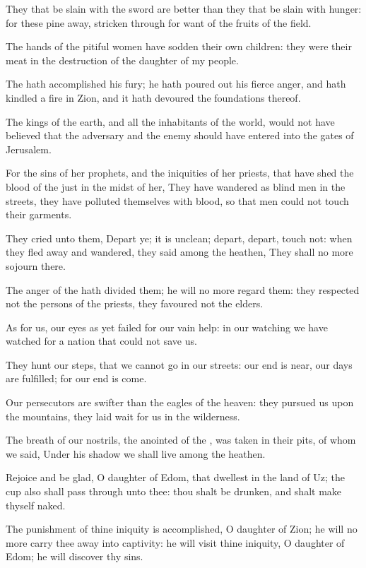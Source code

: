 \Verse They that be slain with the sword are better than they that be slain with hunger: for these pine away, stricken through for want of the fruits of the field.

\Verse The hands of the pitiful women have sodden their own children: they were their meat in the destruction of the daughter of my people.

\Verse The \LORD hath accomplished his fury; he hath poured out his fierce anger, and hath kindled a fire in Zion, and it hath devoured the foundations thereof.

\Verse The kings of the earth, and all the inhabitants of the world, would not have believed that the adversary and the enemy should have entered into the gates of Jerusalem.

\Verse For the sins of her prophets, and the iniquities of her priests, that have shed the blood of the just in the midst of her, \Verse They have wandered as blind men in the streets, they have polluted themselves with blood, so that men could not touch their garments.

\Verse They cried unto them, Depart ye; it is unclean; depart, depart, touch not: when they fled away and wandered, they said among the heathen, They shall no more sojourn there.

\Verse The anger of the \LORD hath divided them; he will no more regard them: they respected not the persons of the priests, they favoured not the elders.

\Verse As for us, our eyes as yet failed for our vain help: in our watching we have watched for a nation that could not save us.

\Verse They hunt our steps, that we cannot go in our streets: our end is near, our days are fulfilled; for our end is come.

\Verse Our persecutors are swifter than the eagles of the heaven: they pursued us upon the mountains, they laid wait for us in the wilderness.

\Verse The breath of our nostrils, the anointed of the \LORD, was taken in their pits, of whom we said, Under his shadow we shall live among the heathen.

\Verse Rejoice and be glad, O daughter of Edom, that dwellest in the land of Uz; the cup also shall pass through unto thee: thou shalt be drunken, and shalt make thyself naked.

\Verse The punishment of thine iniquity is accomplished, O daughter of Zion; he will no more carry thee away into captivity: he will visit thine iniquity, O daughter of Edom; he will discover thy sins.


